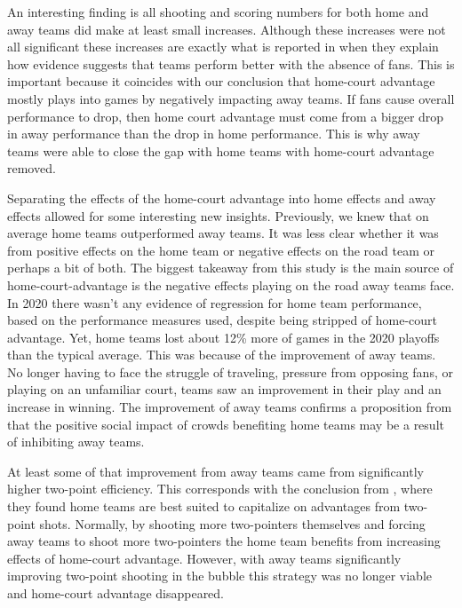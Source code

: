 \documentclass[12pt, letterpaper, titlepage]{article}
\begin{document}
An interesting finding is all shooting and scoring numbers for both home and
away teams did make at least small increases. Although these increases
were not
all significant these increases are exactly what is reported in \citet{Carron2005}
when they explain how evidence suggests that teams perform better with the absence
of fans. This is important because it coincides with our conclusion that home-court
advantage mostly plays into games by negatively impacting away teams. If fans cause
overall performance to drop, then home court advantage must come from a bigger drop
in away performance than the drop in home performance. This is why away teams were
able to close the gap with home teams with home-court advantage removed.

Separating the effects of the home-court advantage into home effects and away
effects allowed for some interesting new insights. Previously, we knew that on
average home teams outperformed away teams. It was less clear whether it was
from positive effects on the home team or negative effects on the road team or
perhaps a bit of both. The biggest takeaway from this study is the main source
of home-court-advantage is the negative effects playing on the road away teams
face. In 2020 there wasn't any evidence of regression for home team performance,
based on the performance measures used, despite being stripped of home-court
advantage. Yet, home teams lost about 12\% more of games in the 2020 playoffs
than the typical average. This was because of the improvement of away teams.
No longer having to face the struggle of traveling, pressure from opposing fans,
or playing on an unfamiliar court, teams saw an improvement in their play and an
increase in winning. The improvement of away teams confirms a proposition from
\citet{Greer} that the positive social impact of crowds benefiting
home teams may be a result of inhibiting away teams.

At least some of that improvement from away teams came from significantly higher
two-point efficiency. This corresponds with the conclusion from \citet{Harris},
where they found home teams are best suited to capitalize on advantages from two-point
shots. Normally, by shooting more two-pointers themselves and forcing away teams to
shoot more two-pointers the home team benefits from increasing effects of
home-court advantage. However, with away teams significantly improving two-point
shooting in the bubble this strategy was no longer viable and home-court
advantage disappeared.
\end{document}
